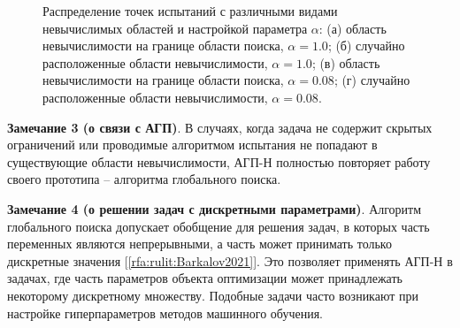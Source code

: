 \documentclass[a4paper,12pt,russian]{article}
\begin{document}
\begin{figure}[h!]
	\caption{Распределение точек испытаний с различными видами невычислимых областей и настройкой параметра $\alpha$: (а) область невычислимости на границе области поиска, $\alpha = 1.0$; (б) случайно расположенные области невычислимости, $\alpha = 1.0$; (в) область невычислимости на границе области поиска, $\alpha = 0.08$; (г) случайно расположенные области невычислимости, $\alpha = 0.08$.}
	\label{task_61}
\end{figure}

\textbf{Замечание 3 (о связи с АГП)}. В случаях, когда задача не содержит скрытых ограничений или проводимые алгоритмом испытания не попадают в существующие области невычислимости, АГП-Н полностью повторяет работу своего прототипа -- алгоритма глобального поиска.

\textbf{Замечание 4 (о решении задач с дискретными параметрами)}. Алгоритм глобального поиска допускает обобщение для решения задач, в которых часть переменных являются непрерывными, а часть может принимать только дискретные значения [\ref{rfa:rulit:Barkalov2021}]. Это позволяет применять АГП-Н в задачах, где часть параметров объекта оптимизации может принадлежать некоторому дискретному множеству. Подобные задачи часто возникают при настройке гиперпараметров методов машинного обучения.





\end{document}
